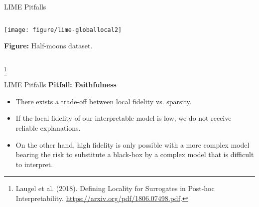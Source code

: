 \documentclass[11pt,compress,t,notes=noshow, aspectratio=169, xcolor=table]{beamer}
\begin{document}
\begin{vbframe}[allowframebreaks]{LIME Pitfalls}
\begin{columns}
\begin{column}{0.39\textwidth}
	\begin{center}
	\texttt{[image: figure/lime-globallocal2]}
	
	\vspace{-0.3cm}
	{\tiny \textbf{Figure:} Half-moons dataset.}
	
\end{center}

	\end{column}
\end{columns}
\footnote[frame]{Laugel et al. (2018). Defining Locality for Surrogates in Post-hoc Interpretability. \url{https://arxiv.org/pdf/1806.07498.pdf}.}
\end{vbframe}

\begin{vbframe}[allowframebreaks]{LIME Pitfalls}
\textbf{Pitfall: Faithfulness}
\begin{itemize}
	\item There exists a trade-off between local fidelity vs. sparsity. 
	\item If the local fidelity of our interpretable model is low, we do not receive reliable explanations.
	\item On the other hand, high fidelity is only possible with a more complex model bearing the risk to substitute a black-box by a complex model that is difficult to interpret.
\end{itemize}
\framebreak


\end{vbframe}
\end{document}
